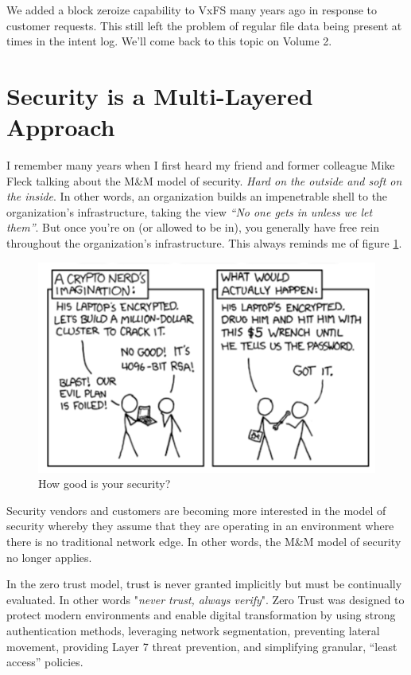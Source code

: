We added a block zeroize capability to VxFS many years ago in response to customer requests. This still left the problem of regular file data being present at times in the intent log. We'll come back to this topic on Volume 2.

\section{Security is a Multi-Layered Approach}

I remember many years when I first heard my friend and former colleague Mike Fleck talking about the M\&M model of security. \textit{Hard on the outside and soft on the inside}. In other words, an organization builds an impenetrable shell to the organization's infrastructure, taking the view \textit{“No one gets in unless we let them”}. But once you're on (or allowed to be in), you generally have free rein throughout the organization’s infrastructure. This always reminds me of figure \ref{fig:mm}.

\begin{figure}
	\includegraphics[scale=0.5]{figures/security.png}
	\centering
	\caption{How good is your security?}
	\label{fig:mm}
\end{figure}

Security vendors and customers are becoming more interested in the  model of security whereby they assume that they are operating in an environment where there is no traditional network edge. In other words, the M\&M model of security no longer applies. 

In the zero trust model, trust is never granted implicitly but must be continually evaluated. In other words "\textit{never trust, always verify}". Zero Trust was designed to protect modern environments and enable digital transformation by using strong authentication methods, leveraging network segmentation, preventing lateral movement, providing Layer 7 threat prevention, and simplifying granular, “least access” policies. 

